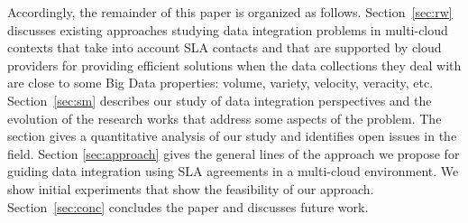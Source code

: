 Accordingly, the remainder of this paper is organized as follows. 
Section~\ref{sec:rw} discusses existing approaches studying data integration problems in multi-cloud contexts that take into account SLA contacts and that are supported by cloud providers for providing efficient solutions when the data collections they deal with are close to some Big Data properties: volume, variety, velocity, veracity, etc.
Section~\ref{sec:sm} describes our study of  data integration perspectives and the evolution of the research works that address some aspects of the problem. The section gives a quantitative analysis of our study and identifies open issues in the field. Section \ref{sec:approach} gives the general lines of the approach we propose for guiding data integration using SLA agreements in a multi-cloud environment. We show initial experiments that show the feasibility of our approach.  
Section~\ref{sec:conc} concludes the paper and discusses future work. 



